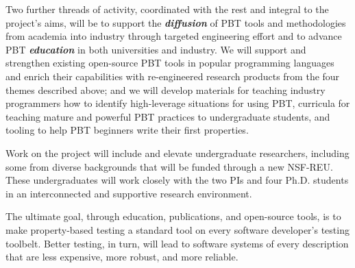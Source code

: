 
Two further threads of activity, coordinated with the rest and integral to the
project's aims, will
%
be to support the {\bf\em diffusion} of PBT tools and
methodologies from academia into industry through targeted engineering effort
%
and to advance PBT {\bf\em education} in
both universities and industry.  We will support and strengthen existing
open-source PBT tools in popular programming languages and enrich their
capabilities with re-engineered research products from the four themes described
above;
%
and we will
develop materials for teaching industry programmers how to identify
high-leverage situations for using PBT, curricula for teaching mature
and powerful PBT practices to undergraduate students, and tooling to help
PBT beginners write their first properties.
%

Work on the project will include and elevate undergraduate
researchers, including some from diverse backgrounds that will be
funded through a new NSF-REU. These undergraduates will work
closely with the two PIs and four Ph.D.{} students in an interconnected and supportive
research environment.

The ultimate goal, through education, publications, and open-source
tools, is to make property-based testing a standard tool on every
software developer's testing toolbelt.  Better testing, in turn, will
lead to software systems of every description that are less expensive, more
robust, and more reliable.


